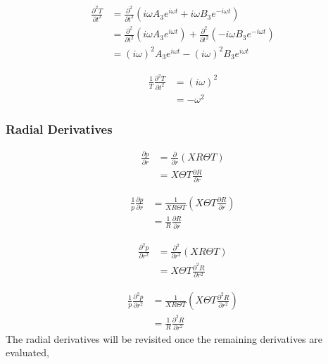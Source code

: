 \documentclass[a4paper]{article}
\begin{document}
\begin{align*}
    \frac{\partial^2 T}{\partial t^2} &=
    \frac{\partial^2}{\partial t^2}
        \left( 
        i \omega A_3 e^{i \omega t} + i \omega B_3 e^{-i \omega t}
    \right)  \\
    &=
    \frac{\partial^2}{\partial t^2} \left(i \omega A_3 e^{i \omega t}  \right) +
    \frac{\partial^2}{\partial t^2} \left(- i \omega B_3 e^{-i \omega t}  \right)\\ 
    &= (i \omega)^2 A_3 e^{i \omega t} - (i \omega)^2 B_3 e^{i \omega t} 
\end{align*}

\begin{align*}
    \frac{1}{T}\frac{\partial^2 T}{\partial t^2} 
    &=
    (i\omega)^2 \\
    &= -\omega^2
\end{align*}


\subsubsection{Radial Derivatives}
\begin{align*}
    \frac{\partial p}{\partial r} 
    &=
    \frac{\partial }{\partial r}  \left( XR\Theta T \right) \\
    &=
    X\Theta T\frac{\partial R}{\partial r}  
\end{align*}


\begin{align*}
    \frac{1}{p}\frac{\partial p}{\partial r} 
    &=
    \frac{ 1}{X R \Theta T}  \left( X\Theta T\frac{\partial R}{\partial r} \right) \\
    &=\frac{ 1}{ R}\frac{\partial R}{\partial r}  
\end{align*}

\begin{align*}
    \frac{\partial^2 p}{\partial r^2} 
    &=
    \frac{\partial^2 }{\partial r^2}  \left( XR\Theta T \right) \\
    &=
    X\Theta T\frac{\partial^2 R}{\partial r^2}  
\end{align*}


\begin{align*}
    \frac{1}{p}\frac{\partial^2 p}{\partial r^2} 
    &=
    \frac{ 1}{X R \Theta T}  \left( X\Theta T \frac{\partial^2 R}{\partial r^2} \right) \\
    &=\frac{ 1}{ R}\frac{\partial^2 R}{\partial r^2}  
\end{align*}
The radial derivatives will be revisited once the remaining derivatives are evaluated,
\end{document}
